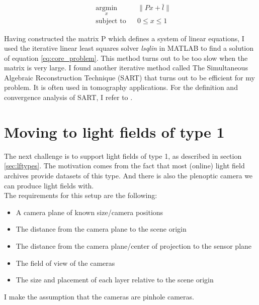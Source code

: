 \documentclass[11pt,a4paper,titlepage]{article}
\begin{document}
	\begin{equation} \label{eq:core_problem}
		\begin{aligned}
			& \underset{x}{\text{argmin}} & & \| Px + \bar{l} \| \\
			& \text{subject to} & & 0 \leq x \leq 1
		\end{aligned}
	\end{equation}

Having constructed the matrix P which defines a system of linear equations, I used the iterative  linear least squares solver \emph{lsqlin} in MATLAB to find a solution of equation \ref{eq:core_problem}. This method turns out to be too slow when the matrix is very large. I found another iterative method called The Simultaneous Algebraic Reconstruction Technique (SART) that turns out to be efficient for my problem. It is often used in tomography applications. For the definition and convergence analysis of SART, I refer to \cite{CONV_SART}.

\section{Moving to light fields of type 1}
The next challenge is to support light fields of type 1, as described in section \ref{sec:lftypes}. The motivation comes from the fact that most (online) light field archives provide datasets of this type. And there is also the plenoptic camera we can produce light fields with. 
\\
The requirements for this setup are the following:

\begin{itemize}
	\item A camera plane of known size/camera positions
	\item The distance from the camera plane to the scene origin
	\item The distance from the camera plane/center of projection to the sensor plane
	\item The field of view of the cameras
	\item The size and placement of each layer relative to the scene origin
\end{itemize}

I make the assumption that the cameras are pinhole cameras.
\end{document}
